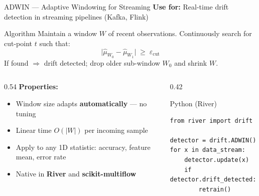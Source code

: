 \documentclass[10pt,aspectratio=169]{beamer}
\begin{document}
\begin{frame}[fragile]{ADWIN --- Adaptive Windowing for Streaming}
  \textbf{Use for:} Real-time drift detection in streaming pipelines (Kafka, Flink)
  \vspace{0.15cm}
  \begin{block}{Algorithm}
    Maintain a window $W$ of recent observations. Continuously search for cut-point $t$ such that:
    \[
      \bigl|\hat{\mu}_{W_0} - \hat{\mu}_{W_1}\bigr| \;\geq\; \varepsilon_{\mathrm{cut}}
    \]
    If found $\Rightarrow$ drift detected; drop older sub-window $W_0$ and shrink $W$.
  \end{block}
  \vspace{0.15cm}
  \begin{columns}[T]
    \begin{column}{0.54\textwidth}
      \textbf{Properties:}
      \begin{itemize}
        \item Window size adapts \textbf{automatically} --- no tuning
        \item Linear time $O(|W|)$ per incoming sample
        \item Apply to any 1D statistic: accuracy, feature mean, error rate
        \item Native in \textbf{River} and \textbf{scikit-multiflow}
      \end{itemize}
    \end{column}
    \begin{column}{0.42\textwidth}
      \begin{exampleblock}{Python (River)}
        \begin{lstlisting}[style=pycode]
from river import drift

detector = drift.ADWIN()
for x in data_stream:
    detector.update(x)
    if detector.drift_detected:
        retrain()
        \end{lstlisting}
      \end{exampleblock}
    \end{column}
  \end{columns}
\end{frame}
\end{document}
